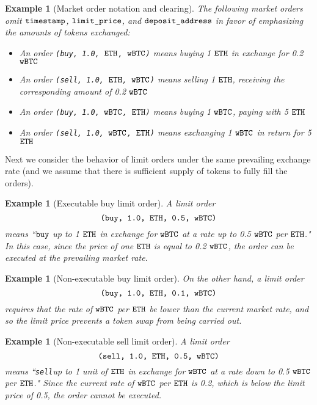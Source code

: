 \documentclass[11pt, reqno]{amsart}
\newtheorem{example}[thm]{Example}
\newcommand{\BTC}{\textnormal{\texttt{wBTC}}}
\newcommand{\ETH}{\textnormal{\texttt{ETH}}}
\newcommand{\timestamp}{\textnormal{\texttt{timestamp}}}
\newcommand{\limitprice}{\textnormal{\texttt{limit\_price}}}
\newcommand{\depositaddress}{\textnormal{\texttt{deposit\_address}}}
\newcommand{\buy}{\textnormal{\texttt{buy}}}
\newcommand{\sell}{\textnormal{\texttt{sell}}}
\begin{document}
\begin{example}[Market order notation and clearing]
The following market orders omit $\timestamp$, $\limitprice$, and
$\depositaddress$ in favor of emphasizing the amounts of tokens exchanged:
\begin{itemize}
    \item An order \texttt{(\buy, 1.0, $\ETH$, $\BTC$)} means buying 1
      $\ETH$ in exchange for 0.2 $\BTC$
    \item An order \texttt{(\sell, 1.0, $\ETH$, $\BTC$)} means selling 1 $\ETH$,
      receiving the corresponding amount of 0.2 $\BTC$
    \item An order \texttt{(\buy, 1.0, $\BTC$, $\ETH$)} means buying 1 $\BTC$,
      paying with 5 $\ETH$
    \item An order \texttt{(\sell, 1.0, $\BTC$, $\ETH$)} means exchanging
      1 $\BTC$ in return for 5 $\ETH$
\end{itemize}
\end{example}

Next we consider the behavior of limit orders under the same prevailing exchange
rate (and we assume that there is sufficient supply of tokens to fully fill the
orders).

\begin{example}[Executable buy limit order]
A limit order
\[
\texttt{(\buy, 1.0, $\ETH$, 0.5, $\BTC$)}
\]
means
``$\buy$ up to 1 $\ETH$ in exchange for $\BTC$ at a rate up to 0.5 $\BTC$ per $\ETH$."
In this case, since the price of one $\ETH$ is equal to 0.2 $\BTC$, the order
can be executed at the prevailing market rate.
\end{example}

\begin{example}[Non-executable buy limit order]
On the other hand, a limit order
\[
\texttt{(\buy, 1.0, $\ETH$, 0.1, $\BTC$)}
\]
requires that the rate of $\BTC$ per $\ETH$ be lower than the current market
rate, and so the limit price prevents a token swap from being carried out.
\end{example}

\begin{example}[Non-executable sell limit order]
A limit order
\[
\texttt{(\sell, 1.0, $\ETH$, 0.5, $\BTC$)}
\]
means
``\sell up to 1 unit of $\ETH$ in exchange for $\BTC$ at a rate down to 0.5 $\BTC$ per $\ETH$."
Since the current rate of $\BTC$ per $\ETH$ is 0.2, which is below the limit
price of 0.5, the order cannot be executed.
\end{example}
\end{document}
